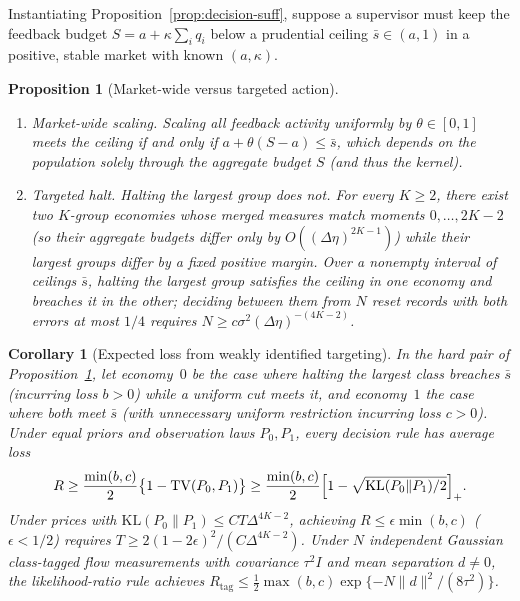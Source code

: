 \documentclass[11pt,letterpaper]{article}
\newtheorem{proposition}[theorem]{Proposition}
\newtheorem{corollary}[theorem]{Corollary}
\theoremstyle{definition}
\newcommand{\KL}{\mathrm{KL}}
\newcommand{\TV}{\mathrm{TV}}
\begin{document}
Instantiating Proposition~\ref{prop:decision-suff}, suppose a supervisor must keep the feedback budget $S = a + \kappa \sum_i q_i$ below a prudential ceiling $\bar{s} \in (a, 1)$ in a positive, stable market with known $(a, \kappa)$.

\begin{proposition}[Market-wide versus targeted action]\label{prop:interventions}
\begin{enumerate}
  \item[(i)] \emph{Market-wide scaling.} Scaling all feedback activity uniformly by $\theta \in [0, 1]$ meets the ceiling if and only if $a + \theta(S - a) \le \bar{s}$, which depends on the population solely through the aggregate budget $S$ (and thus the kernel).
  \item[(ii)] \emph{Targeted halt.} Halting the largest group does not. For every $K \ge 2$, there exist two $K$-group economies whose merged measures match moments $0, \dots, 2K-2$ (so their aggregate budgets differ only by $O((\Delta\eta)^{2K-1})$) while their largest groups differ by a fixed positive margin. Over a nonempty interval of ceilings $\bar{s}$, halting the largest group satisfies the ceiling in one economy and breaches it in the other; deciding between them from $N$ reset records with both errors at most $1/4$ requires $N \ge c \sigma^2 (\Delta\eta)^{-(4K-2)}$.
\end{enumerate}
\end{proposition}

\begin{corollary}[Expected loss from weakly identified targeting]\label{cor:loss}
In the hard pair of Proposition~\ref{prop:interventions}, let economy~$0$ be the case where halting the largest class breaches $\bar{s}$ (incurring loss $b > 0$) while a uniform cut meets it, and economy~$1$ the case where both meet $\bar{s}$ (with unnecessary uniform restriction incurring loss $c > 0$). Under equal priors and observation laws $P_0, P_1$, every decision rule has average loss
\[
  R \ge \frac{\min(b, c)}{2}\bigl\{1 - \TV(P_0, P_1)\bigr\} \ge \frac{\min(b, c)}{2}\Bigl[1 - \sqrt{\KL(P_0 \| P_1)/2}\Bigr]_+.
\]
Under prices with $\KL(P_0 \| P_1) \le C T \Delta^{4K-2}$, achieving $R \le \epsilon \min(b, c)$ ($\epsilon < 1/2$) requires $T \ge 2(1 - 2\epsilon)^2 / (C \Delta^{4K-2})$. Under $N$ independent Gaussian class-tagged flow measurements with covariance $\tau^2 I$ and mean separation $d \neq 0$, the likelihood-ratio rule achieves $R_{\mathrm{tag}} \le \frac{1}{2}\max(b, c)\exp\{-N \|d\|^2 / (8\tau^2)\}$.
\end{corollary}
\end{document}
